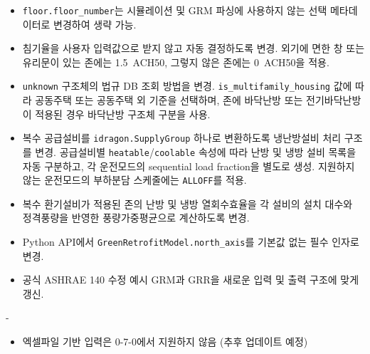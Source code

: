 {\begin{itemize}
        \item \texttt{floor.floor\_number}는 시뮬레이션 및 GRM 파싱에 사용하지 않는 선택 메타데이터로 변경하여 생략 가능.
        \item 침기율을 사용자 입력값으로 받지 않고 자동 결정하도록 변경. 외기에 면한 창 또는 유리문이 있는 존에는 1.5~ACH50, 그렇지 않은 존에는 0~ACH50을 적용.
        \item \texttt{unknown} 구조체의 법규 DB 조회 방법을 변경. \texttt{is\_multifamily\_housing} 값에 따라 공동주택 또는 공동주택 외 기준을 선택하며, 존에 바닥난방 또는 전기바닥난방이 적용된 경우 바닥난방 구조체 구분을 사용.
        \item 복수 공급설비를 \texttt{idragon.SupplyGroup} 하나로 변환하도록 냉난방설비 처리 구조를 변경. 공급설비별 \texttt{heatable}/\texttt{coolable} 속성에 따라 난방 및 냉방 설비 목록을 자동 구분하고, 각 운전모드의 sequential load fraction을 별도로 생성. 지원하지 않는 운전모드의 부하분담 스케줄에는 \texttt{ALLOFF}를 적용.
        \item 복수 환기설비가 적용된 존의 난방 및 냉방 열회수효율을 각 설비의 설치 대수와 정격풍량을 반영한 풍량가중평균으로 계산하도록 변경.
        \item Python API에서 \texttt{GreenRetrofitModel.north\_axis}를 기본값 없는 필수 인자로 변경.
        \item 공식 ASHRAE 140 수정 예시 GRM과 GRR을 새로운 입력 및 출력 구조에 맞게 갱신.
    \end{itemize}
}{
    \par -
}{
    \begin{itemize}
        \item 엑셀파일 기반 입력은 0-7-0에서 지원하지 않음 (추후 업데이트 예정)
    \end{itemize}
}


